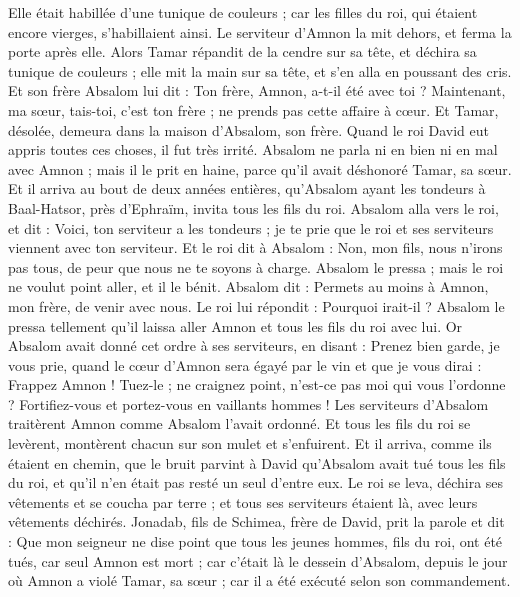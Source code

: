 \begin{multicols}{2}
Elle était habillée d'une tunique de couleurs ; car les filles du roi, qui étaient encore vierges, s'habillaient ainsi. Le serviteur d'Amnon la mit dehors, et ferma la porte après elle.
Alors Tamar répandit de la cendre sur sa tête, et déchira sa tunique de couleurs ; elle mit la main sur sa tête, et s'en alla en poussant des cris.
Et son frère Absalom lui dit : Ton frère, Amnon, a-t-il été avec toi ? Maintenant, ma sœur, tais-toi, c'est ton frère ; ne prends pas cette affaire à cœur. Et Tamar, désolée, demeura dans la maison d'Absalom, son frère.
Quand le roi David eut appris toutes ces choses, il fut très irrité.
Absalom ne parla ni en bien ni en mal avec Amnon ; mais il le prit en haine, parce qu'il avait déshonoré Tamar, sa sœur.
Et il arriva au bout de deux années entières, qu'Absalom ayant les tondeurs à Baal-Hatsor, près d'Ephraïm, invita tous les fils du roi.
Absalom alla vers le roi, et dit : Voici, ton serviteur a les tondeurs ; je te prie que le roi et ses serviteurs viennent avec ton serviteur.
Et le roi dit à Absalom : Non, mon fils, nous n'irons pas tous, de peur que nous ne te soyons à charge. Absalom le pressa ; mais le roi ne voulut point aller, et il le bénit.
Absalom dit : Permets au moins à Amnon, mon frère, de venir avec nous. Le roi lui répondit : Pourquoi irait-il ?
Absalom le pressa tellement qu'il laissa aller Amnon et tous les fils du roi avec lui.
Or Absalom avait donné cet ordre à ses serviteurs, en disant : Prenez bien garde, je vous prie, quand le cœur d'Amnon sera égayé par le vin et que je vous dirai : Frappez Amnon ! Tuez-le ; ne craignez point, n'est-ce pas moi qui vous l'ordonne ? Fortifiez-vous et portez-vous en vaillants hommes !
Les serviteurs d'Absalom traitèrent Amnon comme Absalom l'avait ordonné. Et tous les fils du roi se levèrent, montèrent chacun sur son mulet et s'enfuirent.
Et il arriva, comme ils étaient en chemin, que le bruit parvint à David qu'Absalom avait tué tous les fils du roi, et qu'il n'en était pas resté un seul d'entre eux.
Le roi se leva, déchira ses vêtements et se coucha par terre ; et tous ses serviteurs étaient là, avec leurs vêtements déchirés.
Jonadab, fils de Schimea, frère de David, prit la parole et dit : Que mon seigneur ne dise point que tous les jeunes hommes, fils du roi, ont été tués, car seul Amnon est mort ; car c'était là le dessein d'Absalom, depuis le jour où Amnon a violé Tamar, sa sœur ; car il a été exécuté selon son commandement.

\end{multicols}
